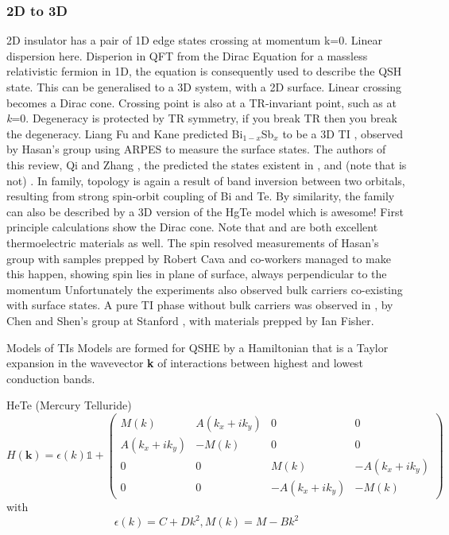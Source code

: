 \documentclass[../mattg_ti-fii_lit-review.tex]{subfiles}
\begin{document}
	\subsubsection{2D to 3D}
	\begin{outline}	
		\1 2D insulator has a pair of 1D edge states crossing at momentum k=0. Linear dispersion here. Disperion in QFT from the Dirac Equation for a massless relativistic fermion in 1D, the equation is consequently used to describe the QSH state.
		\1 This can be generalised to a 3D system, with a 2D surface. Linear crossing becomes a Dirac cone. Crossing point is also at a TR-invariant point, such as at \textit{k}=0. Degeneracy is protected by TR symmetry, if you break TR then you break the degeneracy. 
		\1 Liang Fu and Kane predicted Bi$_{1-x}$Sb$_x$ to be a 3D TI \cite{fu_topological_2007}, observed by Hasan's group \cite{hsieh_topological_2008} using ARPES to measure the surface states.
		The authors of this review, Qi and Zhang \cite{qi_quantum_2010}, the predicted the states existent in \bismuthselinide{}, \bismuthtelluride{} and \antimonytelluride{} (note that \antimonyselenide{} is not) \cite{zhang_topological_2009}.
		\2 In \bismuthtelluride{} family, topology is again a result of band inversion between two orbitals, resulting from strong spin-orbit coupling of Bi and Te. By similarity, the family can also be described by a 3D version of the HgTe model which is awesome! 
		\2 First principle calculations show the Dirac cone.
		\2 Note that \bismuthselinide{} and \bismuthtelluride{} are both excellent thermoelectric materials as well.
		\2 The spin resolved measurements of Hasan's group with samples prepped by Robert Cava and co-workers managed to make this happen, showing spin lies in plane of surface, always perpendicular to the momentum 
		\2 Unfortunately the experiments also observed bulk carriers co-existing with surface states.
		\2 A pure TI phase without bulk carriers was observed in \bismuthtelluride{}, by Chen and Shen's group at Stanford \cite{chen_experimental_2009}, with materials prepped by Ian Fisher.
		
		\1 Models of TIs
		\2 Models are formed for QSHE by a Hamiltonian that is a Taylor expansion in the wavevector \textbf{k} of interactions between highest and lowest conduction bands.
		
		\3 HeTe (Mercury Telluride)
		\begin{equation}
		H(\textbf{k}) = \epsilon(k)\mathds{1} + \left(
		\begin{matrix}
		M(k) & A(k_x+ik_y) & 0 & 0\\
		A(k_x+ik_y) & -M(k) & 0 & 0\\
		0 & 0 & M(k) & -A(k_x+ik_y)\\
		0 & 0 & -A(k_x+ik_y) & -M(k)
		\end{matrix}
		\right)
		\end{equation}
		with \begin{equation}
		\epsilon(k)=C+Dk^2, M(k) = M - Bk^2
		\end{equation}
		

\end{outline}
\end{document}
